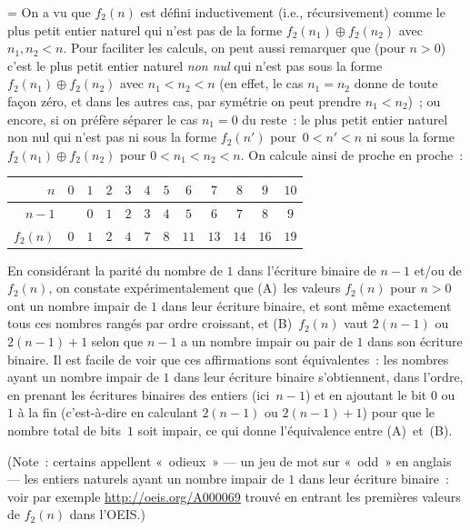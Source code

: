 \documentclass[12pt,a4paper]{article}
\theoremstyle{definition}
\newif\ifcorrige
\newenvironment{corrige}%
{\ifcorrige\relax\else\setbox0=\vbox\bgroup\fi%
\smallbreak\noindent{\underbar{\textit{Corrigé.}}\quad}}
{{\hbox{}\nobreak\hfill\checkmark}%
\ifcorrige\relax\else\egroup\fi\par}
\begin{document}
\begin{corrige}
On a vu que $f_2(n)$ est défini inductivement (i.e., récursivement)
comme le plus petit entier naturel qui n'est pas de la forme $f_2(n_1)
\oplus f_2(n_2)$ avec $n_1,n_2<n$.  Pour faciliter les calculs, on
peut aussi remarquer que (pour $n>0$) c'est le plus petit entier
naturel \emph{non nul} qui n'est pas sous la forme $f_2(n_1) \oplus
f_2(n_2)$ avec $n_1 < n_2 < n$ (en effet, le cas $n_1 = n_2$ donne de
toute façon zéro, et dans les autres cas, par symétrie on peut prendre
$n_1 < n_2$) ; ou encore, si on préfère séparer le cas $n_1=0$ du
reste : le plus petit entier naturel non nul qui n'est pas ni sous la
forme $f_2(n')$ pour $0<n'<n$ ni sous la forme $f_2(n_1) \oplus
f_2(n_2)$ pour $0<n_1<n_2<n$.  On calcule ainsi de proche en proche :

\begin{center}
\begin{tabular}{r|ccccccccccc}
$n$&$0$&$1$&$2$&$3$&$4$&$5$&$6$&$7$&$8$&$9$&$10$\\\hline
$n-1$&&$0$&$1$&$2$&$3$&$4$&$5$&$6$&$7$&$8$&$9$\\\hline
$f_2(n)$&$0$&$1$&$2$&$4$&$7$&$8$&$11$&$13$&$14$&$16$&$19$\\
\end{tabular}
\end{center}

En considérant la parité du nombre de $1$ dans l'écriture binaire de
$n-1$ et/ou de $f_2(n)$, on constate expérimentalement que (A) les
valeurs $f_2(n)$ pour $n>0$ ont un nombre impair de $1$ dans leur
écriture binaire, et sont même exactement tous ces nombres rangés par
ordre croissant, et (B) $f_2(n)$ vaut $2(n-1)$ ou $2(n-1)+1$ selon que
$n-1$ a un nombre impair ou pair de $1$ dans son écriture binaire.  Il
est facile de voir que ces affirmations sont équivalentes : les
nombres ayant un nombre impair de $1$ dans leur écriture binaire
s'obtiennent, dans l'ordre, en prenant les écritures binaires des
entiers (ici $n-1$) et en ajoutant le bit $0$ ou $1$ à la fin
(c'est-à-dire en calculant $2(n-1)$ ou $2(n-1)+1$) pour que le nombre
total de bits $1$ soit impair, ce qui donne l'équivalence entre
(A) et (B).

(Note : certains appellent « odieux » — un jeu de mot sur « odd » en
anglais — les entiers naturels ayant un nombre impair de $1$ dans leur
écriture binaire : voir par exemple \url{http://oeis.org/A000069}
trouvé en entrant les premières valeurs de $f_2(n)$ dans l'OEIS.)


\end{corrige}
\end{document}
